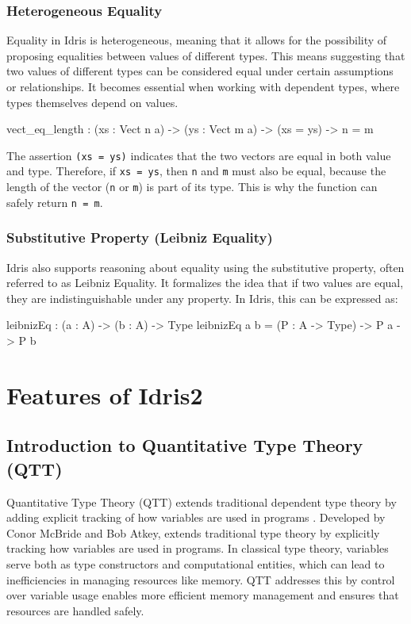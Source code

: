 \documentclass[]{rptuseminar}
\begin{document}
\subsubsection{Heterogeneous Equality}
Equality in Idris is heterogeneous, meaning that it allows for the possibility of proposing equalities between values of different types. This means suggesting that two values of different types can be considered equal under certain assumptions or relationships. It becomes essential when working with dependent types, where types themselves depend on values.

\begin{idris}
vect_eq_length : (xs : Vect n a) -> (ys : Vect m a) ->
(xs = ys) -> n = m 
\end{idris}

The assertion \texttt{(xs = ys)} indicates that the two vectors are equal in both value and type. Therefore, if \texttt{xs = ys}, then \texttt{n} and \texttt{m} must also be equal, because the length of the vector (\texttt{n} or \texttt{m}) is part of its type. This is why the function can safely return \texttt{n = m}.

\subsubsection{Substitutive Property (Leibniz Equality)}
Idris also supports reasoning about equality using the substitutive property, often referred to as Leibniz Equality. It formalizes the idea that if two values are equal, they are indistinguishable under any property. In Idris, this can be expressed as:

\begin{idris}
leibnizEq : (a : A) -> (b : A) -> Type
leibnizEq a b = (P : A -> Type) -> P a -> P b
\end{idris}
\section{Features of Idris2}  
\label{sec:features}

\subsection{Introduction to Quantitative Type Theory (QTT)}
\label{sec:qtt}
Quantitative Type Theory (QTT) extends traditional dependent type theory by adding explicit tracking of how variables are used in programs \cite{atkey2018syntax}. Developed by Conor McBride and Bob Atkey, extends traditional type theory by explicitly tracking how variables are used in programs. In classical type theory, variables serve both as type constructors and computational entities, which can lead to inefficiencies in managing resources like memory. QTT addresses this by control over variable usage enables more efficient memory management and ensures that resources are handled safely.
\end{document}
